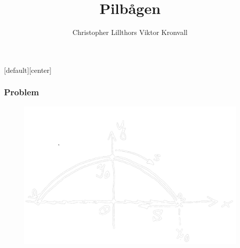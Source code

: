 \documentclass[xcolor=dvipsnames]{beamer}
\author{Christopher Lillthors Viktor Kronvall}
\title{Pilbågen}
\begin{document}
\maketitle
{}[default][center]

\begin{lrbox}{\firstexample}

\end{lrbox}

\begin{lrbox}{\secondexample}

\end{lrbox}

\begin{frame}
\frametitle{Problem}
\begin{figure}[h!]
\centering
\includegraphics[scale=0.2]{bild.png}
\end{figure}
\end{frame}
\end{document}
